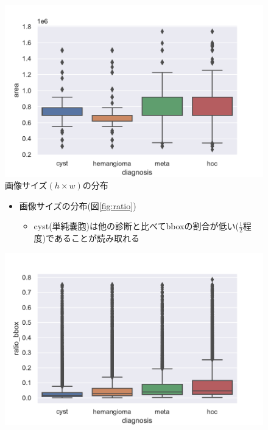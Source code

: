 \documentclass[a4j]{ujarticle}
\newcommand{\Fref}[1]{\mbox{図\ref{fig:#1}}}
\begin{document}
\begin{itemize}
\begin{figure}[ht]
\begin{minipage}{.59\textwidth}
\begin{itemize}
\begin{itemize}
\begin{itemize}
							\end{itemize}
						\end{itemize}
					\end{itemize}
				\end{minipage}
				\begin{minipage}{.39\textwidth}
					\centering
					\includegraphics[width=\linewidth]{../fig/area_a.pdf}
					\caption{画像サイズ$(h \times w)$の分布}
					\label{fig:area}
				\end{minipage}
			\end{figure}
			\begin{figure}[ht]
				\begin{minipage}{.59\textwidth}
					\begin{itemize}
						\item 画像サイズの分布(\Fref{ratio})
						\begin{itemize}
							\item cyst(単純嚢胞)は他の診断と比べてbboxの割合が低い($\frac{1}{2}$程度)であることが読み取れる
						\end{itemize}
					\end{itemize}
				\end{minipage}
				\begin{minipage}{.39\textwidth}
					\centering
					\includegraphics[width=\linewidth]{../fig/ratio_bbox_a.pdf}

\end{minipage}
\end{figure}
\end{itemize}
\end{document}
